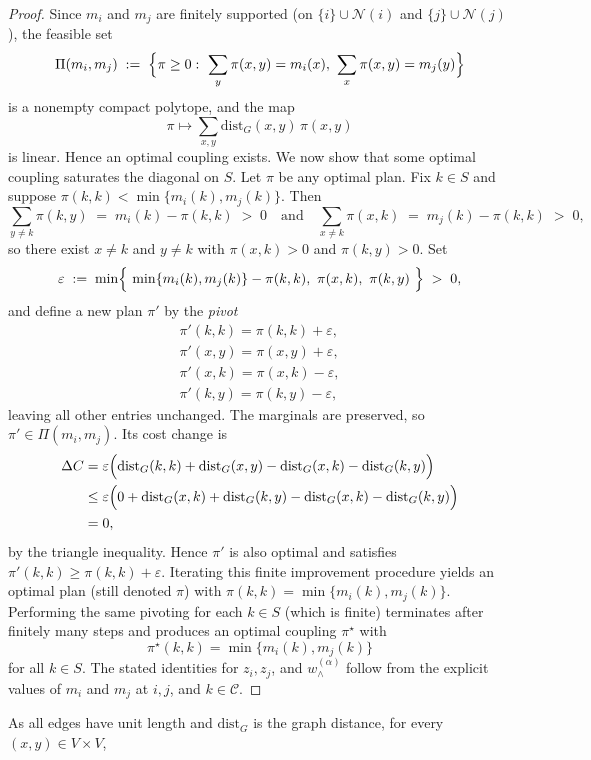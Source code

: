 \documentclass[twoside,11pt]{article}
\numberwithin{equation}{section}
\numberwithin{theorem}{section}
\numberwithin{example}{section}
\begin{document}
\begin{proof}
Since $m_i$ and $m_j$ are finitely supported (on $\{i\}\cup\mathcal N(i)$ and $\{j\}\cup\mathcal N(j)$),
the feasible set
\[
\Pi(m_i,m_j)\;:=\;\Bigl\{\pi\ge 0:\ \sum_{y}\pi(x,y)=m_i(x),\ \sum_{x}\pi(x,y)=m_j(y)\Bigr\}
\]
is a nonempty compact polytope, and the map
\[
\pi\mapsto \sum_{x,y}\mathrm{dist}_G(x,y)\,\pi(x,y)
\]
is linear. Hence an optimal coupling exists. We now show that some optimal coupling saturates the diagonal on $S$.
Let $\pi$ be any optimal plan. Fix $k\in S$ and suppose
$\pi(k,k)<\min\{m_i(k),m_j(k)\}$. Then
\[
\sum_{y\ne k}\pi(k,y)\;=\;m_i(k)-\pi(k,k)\;>\;0
\quad\text{and}\quad
\sum_{x\ne k}\pi(x,k)\;=\;m_j(k)-\pi(k,k)\;>\;0,
\]
so there exist $x\ne k$ and $y\ne k$ with $\pi(x,k)>0$ and $\pi(k,y)>0$.
Set
\[
\varepsilon\;:=\;\min\Bigl\{\ \min\{m_i(k),m_j(k)\}-\pi(k,k),\ \pi(x,k),\ \pi(k,y)\ \Bigr\}\;>\;0,
\]
and define a new plan $\pi'$ by the \emph{pivot}
\[
\begin{aligned}
\pi'(k,k)=\pi(k,k)+\varepsilon,\\
\pi'(x,y)=\pi(x,y)+\varepsilon,\\
\pi'(x,k)=\pi(x,k)-\varepsilon,\\
\pi'(k,y)=\pi(k,y)-\varepsilon,
\end{aligned}
\]
leaving all other entries unchanged. The marginals are preserved, so $\pi'\in\Pi(m_i,m_j)$.
Its cost change is
\[
\begin{aligned}
\Delta C
&= \varepsilon\Bigl(\mathrm{dist}_G(k,k)+\mathrm{dist}_G(x,y)-\mathrm{dist}_G(x,k)-\mathrm{dist}_G(k,y)\Bigr)\\
&\le \varepsilon\Bigl(0+\mathrm{dist}_G(x,k)+\mathrm{dist}_G(k,y)-\mathrm{dist}_G(x,k)-\mathrm{dist}_G(k,y)\Bigr)\\
&=0,
\end{aligned}
\]
by the triangle inequality. Hence $\pi'$ is also optimal and satisfies
$\pi'(k,k)\ge \pi(k,k)+\varepsilon$. Iterating this finite improvement
procedure yields an optimal plan (still denoted $\pi$) with
$\pi(k,k)=\min\{m_i(k),m_j(k)\}$. Performing the same pivoting for each $k\in S$ (which is finite) terminates
after finitely many steps and produces an optimal coupling $\pi^\star$ with
\[
\pi^\star(k,k)=\min\{m_i(k),m_j(k)\}
\]
for all $k\in S$. The stated identities
for $z_i,z_j$, and $w^{(\alpha)}_\wedge$ follow from the explicit values of
$m_i$ and $m_j$ at $i,j$, and $k\in\mathcal C$.
\end{proof}
As all edges have unit length and $\mathrm{dist}_G$ is the graph distance, for every $(x,y)\in V\times V$,
\end{document}
